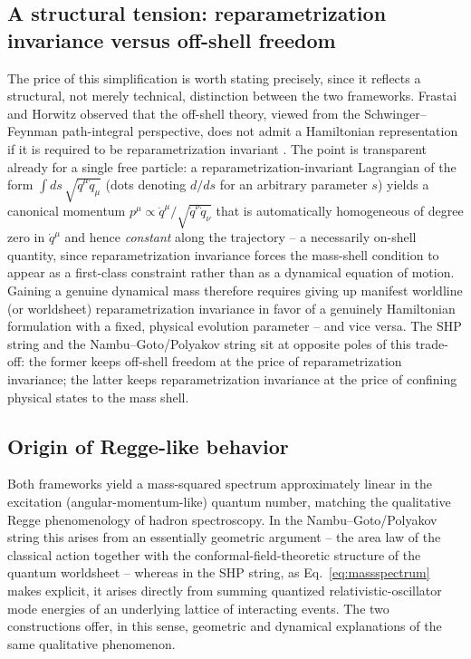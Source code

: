 \documentclass[11pt]{article}
\newcommand{\eqn}[1]{Eq.~\eqref{#1}}
\begin{document}
\subsection{A structural tension: reparametrization invariance versus off-shell freedom}
\label{sec:tension}

The price of this simplification is worth stating precisely, since it reflects
a structural, not merely technical, distinction between the two frameworks.
Frastai and Horwitz observed that the off-shell theory, viewed from the
Schwinger--Feynman path-integral perspective, does not admit a Hamiltonian
representation if it is required to be reparametrization invariant
\cite{FrastaiHorwitz1995}. The point is transparent already for a single free
particle: a reparametrization-invariant Lagrangian of the form
$\int ds\,\sqrt{\dot q^\mu\dot q_\mu}$ (dots denoting $d/ds$ for an arbitrary
parameter $s$) yields a canonical momentum
$p^\mu\propto \dot q^\mu/\sqrt{\dot q^\nu\dot q_\nu}$ that is automatically
homogeneous of degree zero in $\dot q^\mu$ and hence \emph{constant} along the
trajectory -- a necessarily on-shell quantity, since reparametrization
invariance forces the mass-shell condition to appear as a first-class
constraint rather than as a dynamical equation of motion. Gaining a genuine
dynamical mass therefore requires giving up manifest worldline (or worldsheet)
reparametrization invariance in favor of a genuinely Hamiltonian formulation
with a fixed, physical evolution parameter -- and vice versa. The SHP string
and the Nambu--Goto/Polyakov string sit at opposite poles of this trade-off:
the former keeps off-shell freedom at the price of reparametrization
invariance; the latter keeps reparametrization invariance at the price of
confining physical states to the mass shell.

\subsection{Origin of Regge-like behavior}

Both frameworks yield a mass-squared spectrum approximately linear in the
excitation (angular-momentum-like) quantum number, matching the qualitative
Regge phenomenology of hadron spectroscopy. In the Nambu--Goto/Polyakov
string this arises from an essentially geometric argument -- the area law of
the classical action together with the conformal-field-theoretic structure of
the quantum worldsheet -- whereas in the SHP string, as
\eqn{eq:massspectrum} makes explicit, it arises directly from summing
quantized relativistic-oscillator mode energies of an underlying lattice of
interacting events. The two constructions offer, in this sense, geometric and
dynamical explanations of the same qualitative phenomenon.
\end{document}
